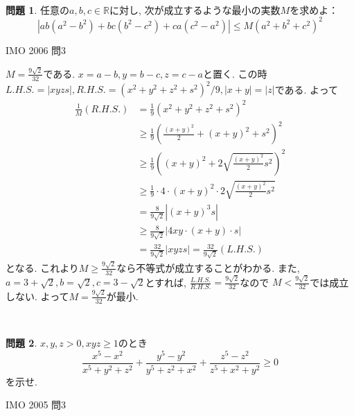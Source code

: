 \documentclass[uplatex, a5paper]{jsarticle}
\makeatletter
\theoremstyle{definition}
\newtheorem{prob}{問題}
\renewenvironment{proof}[1][\proofname]{
  \pushQED{\qed}%
  \normalfont \topsep6\p@\@plus6\p@\relax
  \trivlist
  \item[\hskip\labelsep
    #1\@addpunct{\textbf{.}}]\ignorespaces
}{%
  \popQED\endtrivlist\@endpefalse
}
\providecommand{\proofname}{証明}
\newcommand{\lhs }{ L.H.S. }
\newcommand{\rhs }{ R.H.S. }
\def\qed{\hfill $\Box$}
\makeatother
\begin{document}
\





\newpage

\begin{prob}
  任意の\(a,b,c \in \mathbb{R}\)に対し, 次が成立するような最小の実数\(M\)を求めよ：
  \[
  \left| ab(a^2-b^2 )+ bc(b^2-c^2 )+ ca(c^2-a^2 ) \right| \leq M(a^2+b^2+c^2 )^2
  \]
  \begin{flushright}
    IMO 2006 問3
  \end{flushright}
\end{prob}


\begin{proof}
  \(M=\displaystyle\frac{9\sqrt{2}}{32}\)である.
  \(x=a-b,y=b-c,z=c-a\)と置く.
  この時\(\lhs = |xyzs| , \rhs = (x^2+y^2+z^2+s^2)^2/9 , |x+y|=|z|\)である.
  よって
  \begin{align*}
    \frac{1}{M}(R.H.S.) &= \frac{1}{9}(x^2+y^2+z^2+s^2)^2  \\
    &\geq  \frac{1}{9}\left( \frac{(x+y)^2}{2} + (x+y)^2 + s^2 \right) ^2  \\
    &\geq  \frac{1}{9}\left( (x+y)^2 + 2\sqrt{\frac{(x+y)^2}{2}s^2} \right) ^2  \\
    &\geq  \frac{1}{9} \cdot 4 \cdot (x+y)^2 \cdot 2\sqrt{\frac{(x+y)^2}{2}s^2}  \\
    &=  \frac{8}{9\sqrt{2}} \left| (x+y)^3s \right|  \\
    &\geq  \frac{8}{9\sqrt{2} } \left| 4xy \cdot (x+y) \cdot s \right|  \\
    &=  \frac{32}{9\sqrt{2} } \left| xyzs \right| = \frac{32}{9\sqrt{2} }( L.H.S.)
  \end{align*}
  となる. これより\(M \geq \displaystyle\frac{9\sqrt{2}}{32}\)なら不等式が成立することがわかる.
  また, \(a=3+\sqrt{2} ,b= \sqrt{2} , c=3- \sqrt{2}\)とすれば,
  \(\displaystyle\frac{L.H.S. }{R.H.S.} = \displaystyle\frac{9\sqrt{2}}{32}\)なので
  \(M < \displaystyle\frac{9\sqrt{2}}{32}\)では成立しない.
  よって\(M=\displaystyle\frac{9\sqrt{2}}{32}\)が最小.
\end{proof}






\




\newpage

\begin{prob}
  \(x,y,z > 0 , xyz \geq 1\)のとき
  \[
  \frac{x^5-x^2}{x^5+y^2+z^2} + \frac{y^5-y^2}{y^5+z^2+x^2} + \frac{z^5-z^2}{z^5+x^2+y^2} \geq 0
  \]
  を示せ.
  \begin{flushright}
    IMO 2005 問3
  \end{flushright}
\end{prob}
\end{document}
